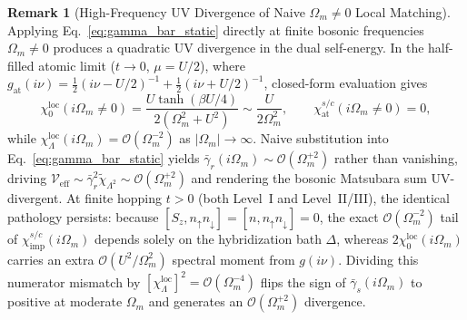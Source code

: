 \documentclass[11pt,a4paper]{article}
\numberwithin{equation}{section}
\theoremstyle{plain}
\theoremstyle{definition}
\newtheorem{remark}{Remark}[section]
\begin{document}
\begin{remark}[High-Frequency UV Divergence of Naive $\Omega_m \neq 0$ Local Matching]
\label{rem:uv_div}
Applying Eq.~\eqref{eq:gamma_bar_static} directly at finite bosonic frequencies
$\Omega_m \neq 0$ produces a quadratic UV divergence in the dual self-energy. In the
half-filled atomic limit ($t \to 0$, $\mu = U/2$), where
$g_{\mathrm{at}}(i\nu) = \frac{1}{2}(i\nu - U/2)^{-1} + \frac{1}{2}(i\nu + U/2)^{-1}$,
closed-form evaluation gives
\begin{equation}
    \chi_0^{\mathrm{loc}}(i\Omega_m \neq 0)
    = \frac{U\tanh(\beta U/4)}{2(\Omega_m^2 + U^2)}
    \sim \frac{U}{2\Omega_m^2},
    \qquad
    \chi_{\mathrm{at}}^{s/c}(i\Omega_m \neq 0) = 0,
    \label{eq:atomic_tail}
\end{equation}
while $\chi_{\Lambda}^{\mathrm{loc}}(i\Omega_m) = \mathcal{O}(\Omega_m^{-2})$ as
$|\Omega_m| \to \infty$. Naive substitution into Eq.~\eqref{eq:gamma_bar_static} yields
$\bar{\gamma}_r(i\Omega_m) \sim \mathcal{O}(\Omega_m^{+2})$ rather than vanishing,
driving $\mathcal{V}_{\mathrm{eff}} \sim \bar{\gamma}_r^2\tilde{\chi}_{\Lambda^2} \sim \mathcal{O}(\Omega_m^{+2})$
and rendering the bosonic Matsubara sum UV-divergent. At finite hopping $t > 0$ (both
Level~I and Level~II/III), the identical pathology persists: because
$[S_z, n_\uparrow n_\downarrow] = [n, n_\uparrow n_\downarrow] = 0$, the exact
$\mathcal{O}(\Omega_m^{-2})$ tail of $\chi_{\mathrm{imp}}^{s/c}(i\Omega_m)$ depends
solely on the hybridization bath $\Delta$, whereas $2\chi_0^{\mathrm{loc}}(i\Omega_m)$
carries an extra $\mathcal{O}(U^2/\Omega_m^2)$ spectral moment from $g(i\nu)$. Dividing
this numerator mismatch by $[\chi_\Lambda^{\mathrm{loc}}]^2 = \mathcal{O}(\Omega_m^{-4})$
flips the sign of $\bar{\gamma}_s(i\Omega_m)$ to positive at moderate $\Omega_m$ and
generates an $\mathcal{O}(\Omega_m^{+2})$ divergence.
\end{remark}
\end{document}
